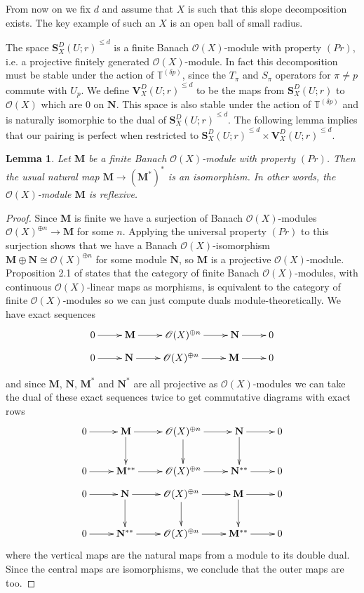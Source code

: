 \documentclass[a4paper, notitlepage]{amsart}
\newcommand{\OO}{\ensuremath{\mathscr{O}}\xspace}
\newtheorem{lemma}[theorem]{Lemma}
\newcommand{\OC}{\ensuremath{\mathbf{S}^D_{X}(U;r)}\xspace}
\newcommand{\OCd}{\ensuremath{\mathbf{V}^D_{X}(U;r)}\xspace}
\begin{document}
From now on we fix $d$ and assume that $X$ is such that this slope decomposition exists. The key example of such an $X$ is an open ball of small radius.

The space $\OC^{\leq d}$ is a finite Banach $\OO(X)$-module with property $(Pr)$, i.e. a projective finitely generated $\OO(X)$-module. In fact this decomposition must be stable under the action of $\mathbb{T}^{(\delta p)}$, since the $T_\pi$ and $S_\pi$ operators for $\pi \neq p$ commute with $U_p$. We define $\OCd^{\leq d}$ to be the maps from $\OC$ to $\OO(X)$ which are $0$ on $\mathbf{N}$. This space is also stable under the action of $\mathbb{T}^{(\delta p)}$ and is naturally isomorphic to the dual of $\OC^{\leq d}$. The following lemma implies that our pairing is perfect when restricted to $\OC^{\leq d}\times \OCd^{\leq d}$. 

\begin{lemma}
Let $\mathbf{M}$ be a finite Banach $\OO(X)$-module with property $(Pr)$. Then the usual natural map $\mathbf{M}\rightarrow (\mathbf{M}^{*})^{*}$ is an isomorphism. In other words, the $\OO(X)$-module $\mathbf{M}$ is \emph{reflexive}.
\end{lemma}
\begin{proof}
Since $\mathbf{M}$ is finite we have a surjection of Banach $\OO(X)$-modules $\OO(X)^{\oplus n}\rightarrow \mathbf{M}$ for some $n$. Applying the universal property $(Pr)$ to this surjection shows that we have a Banach $\OO(X)$-isomorphism $\mathbf{M}\oplus \mathbf{N} \cong \OO(X)^{\oplus n}$ for some module $\mathbf{N}$, so $\mathbf{M}$ is a projective $\OO(X)$-module. Proposition 2.1 of \cite{Bu2} states that the category of finite Banach $\OO(X)$-modules, with continuous
$\OO(X)$-linear maps as morphisms, is equivalent to the category of
finite $\OO(X)$-modules so we can just compute duals module-theoretically. We have exact sequences
$$\xymatrix{0\ar[r]&\mathbf{M}\ar[r]&\OO(X)^{\oplus n}\ar[r]&\mathbf{N}\ar[r]&0} $$
$$\xymatrix{0\ar[r]&\mathbf{N}\ar[r]&\OO(X)^{\oplus n}\ar[r]&\mathbf{M}\ar[r]&0} $$

and since $\mathbf{M}$, $\mathbf{N}$, $\mathbf{M}^*$ and $\mathbf{N}^*$ are all projective as $\OO(X)$-modules we can take the dual of these exact sequences twice to get commutative diagrams with exact rows
$$\xymatrix{
0\ar[r]&\mathbf{M}\ar[r]\ar[d]&\OO(X)^{\oplus n}\ar[r]\ar[d]&\mathbf{N}\ar[r]\ar[d]&0\\
0\ar[r]&\mathbf{M}^{**}\ar[r]&\OO(X)^{\oplus n}\ar[r]&\mathbf{N}^{**}\ar[r]&0\\
}$$
$$\xymatrix{
0\ar[r]&\mathbf{N}\ar[r]\ar[d]&\OO(X)^{\oplus n}\ar[r]\ar[d]&\mathbf{M}\ar[r]\ar[d]&0\\
0\ar[r]&\mathbf{N}^{**}\ar[r]&\OO(X)^{\oplus n}\ar[r]&\mathbf{M}^{**}\ar[r]&0\\
}$$
where the vertical maps are the natural maps from a module to its double dual. Since the central maps are isomorphisms, we conclude that the outer maps are too.
\end{proof} 
\end{document}
